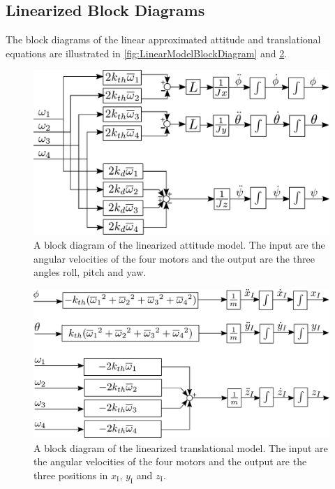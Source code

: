 \subsection{Linearized Block Diagrams}
The block diagrams of the linear approximated attitude and translational equations are illustrated in \autoref{fig:LinearModelBlockDiagram} and \ref{fig:TranslationalLinearModelBlockDiagram}. 
\begin{figure}[H]
	\centering
	\includegraphics[scale=0.3]{figures/LinearModelBlockDiag.pdf}
	\caption{A block diagram of the linearized attitude model. The input are the angular velocities of the four motors and the output are the three angles roll, pitch and yaw.}
	\label{fig:LinearModelBlockDiagram}
\end{figure}
\begin{figure}[H]
	\centering
	\includegraphics[scale=0.3]{figures/TranslationalLinearModelBlockDiagram.pdf}
	\caption{A block diagram of the linearized translational model. The input are the angular velocities of the four motors and the output are the three positions in $x_{\mathrm{I}}$, $y_{\mathrm{I}}$ and $z_{\mathrm{I}}$.}
	\label{fig:TranslationalLinearModelBlockDiagram}
\end{figure}


